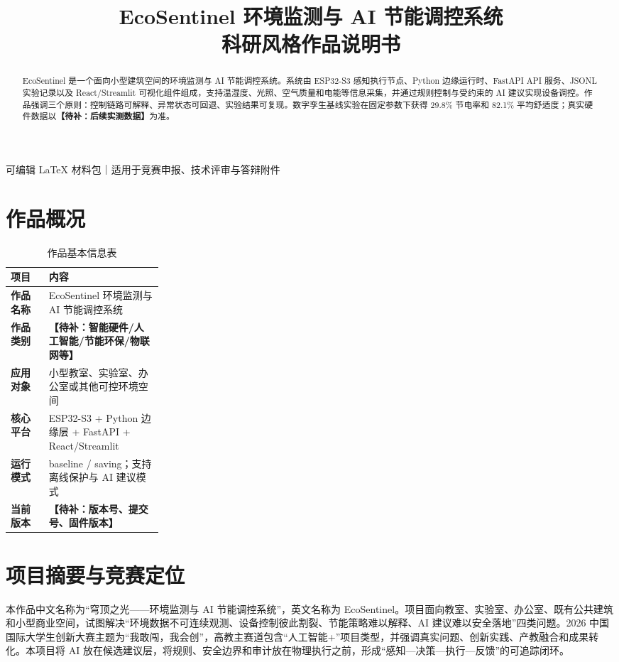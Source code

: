 \documentclass[UTF8,a4paper,zihao=-4]{ctexart}
\title{\vspace{-1cm}\textcolor{EcoNavy}{EcoSentinel 环境监测与 AI 节能调控系统}\\[0.4em]\Large 科研风格作品说明书}
\author{\placeholder{学校、团队、成员、指导教师}}\date{\placeholder{提交日期与版本号}}
\newcommand{\placeholder}[1]{\textcolor{EcoOrange}{\textbf{【待补：#1】}}}
\begin{document}
\maketitle
\begin{center}\small 可编辑 LaTeX 材料包｜适用于竞赛申报、技术评审与答辩附件\end{center}
\begin{abstract}
EcoSentinel 是一个面向小型建筑空间的环境监测与 AI 节能调控系统。系统由 ESP32-S3 感知执行节点、Python 边缘运行时、FastAPI API 服务、JSONL 实验记录以及 React/Streamlit 可视化组件组成，支持温湿度、光照、空气质量和电能等信息采集，并通过规则控制与受约束的 AI 建议实现设备调控。作品强调三个原则：控制链路可解释、异常状态可回退、实验结果可复现。数字孪生基线实验在固定参数下获得 29.8\% 节电率和 82.1\% 平均舒适度；真实硬件数据以\placeholder{后续实测数据}为准。
\end{abstract}
\tableofcontents\newpage
\section{作品概况}
\begin{table}[htbp]\centering\caption{作品基本信息表}\begin{tabularx}{\linewidth}{>{\bfseries}p{0.25\linewidth}X}\toprule 项目 & 内容\\\midrule 作品名称 & EcoSentinel 环境监测与 AI 节能调控系统\\ 作品类别 & \placeholder{智能硬件/人工智能/节能环保/物联网等}\\ 应用对象 & 小型教室、实验室、办公室或其他可控环境空间\\ 核心平台 & ESP32-S3 + Python 边缘层 + FastAPI + React/Streamlit\\ 运行模式 & baseline / saving；支持离线保护与 AI 建议模式\\ 当前版本 & \placeholder{版本号、提交号、固件版本}\\\bottomrule\end{tabularx}\end{table}
\section{项目摘要与竞赛定位}
本作品中文名称为“穹顶之光——环境监测与 AI 节能调控系统”，英文名称为 EcoSentinel。项目面向教室、实验室、办公室、既有公共建筑和小型商业空间，试图解决“环境数据不可连续观测、设备控制彼此割裂、节能策略难以解释、AI 建议难以安全落地”四类问题。2026 中国国际大学生创新大赛主题为“我敢闯，我会创”，高教主赛道包含“人工智能+”项目类型，并强调真实问题、创新实践、产教融合和成果转化。本项目将 AI 放在候选建议层，将规则、安全边界和审计放在物理执行之前，形成“感知—决策—执行—反馈”的可追踪闭环。
\end{document}
